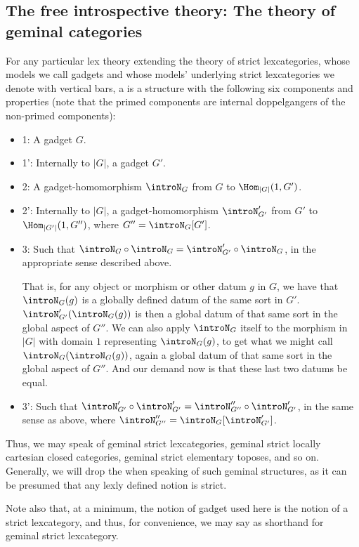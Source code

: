 \subsection{The free introspective theory: The theory of geminal categories}
\begin{definition}
For any particular lex theory extending the theory of strict lexcategories, whose models we call gadgets and whose models' underlying strict lexcategories we denote with vertical bars, a  is a structure with the following six components and properties (note that the primed components are internal doppelgangers of the non-primed components):
\begin{itemize}
    \item 1: A gadget $G$.
    \item 1': Internally to $|G|$, a gadget $G'$.
    \item 2: A gadget-homomorphism $\introN_G$ from $G$ to $\Hom_{|G|}(1, G')$.
    \item 2': Internally to $|G|$, a gadget-homomorphism $\introN'_{G'}$ from $G'$ to $\Hom_{|G'|}(1, G'')$, where $G'' = \introN_G[G']$.
    \item 3: Such that $\introN_G \circ \introN_G = \introN'_{G'} \circ \introN_G$, in the appropriate sense described above.
    
    That is, for any object or morphism or other datum $g$ in $G$, we have that $\introN_G(g)$ is a globally defined datum of the same sort in $G'$. $\introN'_{G'} (\introN_G(g))$ is then a global datum of that same sort in the global aspect of $G''$. We can also apply $\introN_G$ itself to the morphism in $|G|$ with domain $1$ representing $\introN_G(g)$, to get what we might call $\introN_G (\introN_G(g))$, again a global datum of that same sort in the global aspect of $G''$. And our demand now is that these last two datums be equal.
    
    \item 3': Such that $\introN'_{G'} \circ \introN'_{G'} = \introN''_{G''} \circ \introN'_{G'}$, in the same sense as above, where $\introN''_{G''} = \introN_{G}[\introN'_{G'}]$.
\end{itemize}
Thus, we may speak of geminal strict lexcategories, geminal strict locally cartesian closed categories, geminal strict elementary toposes, and so on. Generally, we will drop the  when speaking of such geminal structures, as it can be presumed that any lexly defined notion is strict.

Note also that, at a minimum, the notion of gadget used here is the notion of a strict lexcategory, and thus, for convenience, we may say  as shorthand for geminal strict lexcategory.


\end{definition}
